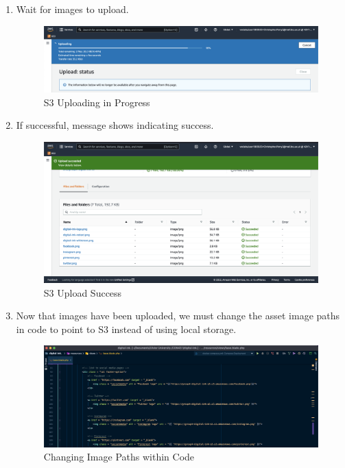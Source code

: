 \begin{enumerate}
    \item Wait for images to upload.\nolinebreak
        \begin{figure}[H]
            \centering
            \includegraphics[width=\textwidth]{resources/s3/s3-uploading.png}
            \caption{S3 Uploading in Progress}
            \label{fig:s3-uploading}
        \end{figure}

    \item If successful, message shows indicating success.\nolinebreak
        \begin{figure}[H]
            \centering
            \includegraphics[width=\textwidth]{resources/s3/s3-uploaded.png}
            \caption{S3 Upload Success}
            \label{fig:s3-uploaded}
        \end{figure}

    \item Now that images have been uploaded, we must change the asset image paths in code to point to S3 instead of using local storage.\nolinebreak
        \begin{figure}[H]
            \centering
            \includegraphics[width=\textwidth]{resources/s3/s3-url-change.png}
            \caption{Changing Image Paths within Code}
            \label{fig:s3-url-change}
        \end{figure}


\end{enumerate}
